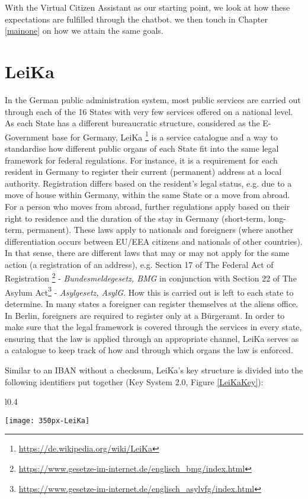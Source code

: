 With the Virtual Citizen Assistant as our starting point, we look at how these expectations are fulfilled through the chatbot. 
we then touch in Chapter \ref{mainone} on how we attain the same goals.



\section{LeiKa}
\label{leikaSec}

In the German public administration system, most public services are carried out through each of the 16 States with very few services offered on a national level. As each State has a different bureaucratic structure, considered as the E-Government base for Germany, LeiKa \footnote{\url{https://de.wikipedia.org/wiki/LeiKa}} is a service catalogue and a way to standardise how different public organs of each State fit into the same legal framework for federal regulations. For instance, it is a requirement for each resident in Germany to register their current (permanent) address at a local authority. Registration differs based on the resident's legal status, e.g. due to a move of house within Germany, within the same State or a move from abroad. For a person who moves from abroad, further regulations apply based on their right to residence and the duration of the stay in Germany (short-term, long-term, permanent). These laws apply to nationals and foreigners (where another differentiation occurs between EU/EEA citizens and nationals of other countries). In that sense, there are different laws that may or may not apply for the same action (a registration of an address), e.g. Section 17 of The Federal Act of Registration \footnote{\url{https://www.gesetze-im-internet.de/englisch_bmg/index.html}} - \textit{Bundesmeldegesetz, BMG} in conjunction with Section 22 of The Asylum Act\footnote{\url{https://www.gesetze-im-internet.de/englisch_asylvfg/index.html}} - \textit{Asylgesetz, AsylG}. How this is carried out is left to each state to determine. In many states a foreigner can register themselves at the aliens office. In Berlin, foreigners are required to register only at a Bürgeramt. In order to make sure that the legal framework is covered through the services in every state, ensuring that the law is applied through an appropriate channel, LeiKa serves as a catalogue to keep track of how and through which organs the law is enforced.




Similar to an IBAN without a checksum, LeiKa's key structure is divided into the following identifiers put together (Key System 2.0, Figure \ref{LeiKaKey}):
\begin{wrapfigure}{l}{0.4\textwidth}
	\caption[Leika Key System]{Leika Key System 2.0, based on \footnotemark, \footnotesize \copyright \href{https://de.wikipedia.org/wiki/Leika}{CC, Wikipedia}}
	\label{LeiKaKey}
	\texttt{[image: 350px-LeiKa]}
\end{wrapfigure}

